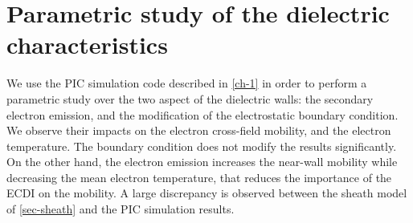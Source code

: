 



\chapter{Parametric study of the dielectric characteristics}
\label{ch-2}

\begin{Chabstract}
We use the PIC simulation code described in \cref{ch-1} in order to perform a parametric study over the two aspect of the dielectric walls\string: the secondary electron emission, and the modification of the electrostatic boundary condition.
We observe their impacts on the electron cross-field mobility, and the electron temperature.
The boundary condition does not modify the results significantly.
On the other hand, the electron emission increases the near-wall mobility while decreasing the mean electron temperature, that reduces the importance of the \ac{ECDI} on the mobility.
A large discrepancy is observed between the sheath model of \cref{sec-sheath} and the PIC simulation results.
\end{Chabstract}



\minitoc


% 
% 
% 
% 
% 
% 
% 









